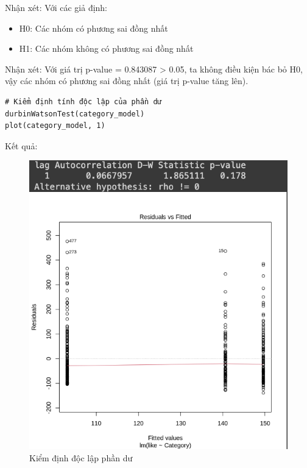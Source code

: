 \begin{itemize}
\begin{lstlisting}
    \end{lstlisting}
    Nhận xét:
    Với các giả định:
        \begin{itemize}
            \item H0: Các nhóm có phương sai đồng nhất
            \item H1: Các nhóm không có phương sai đồng nhất
        \end{itemize}
    Nhận xét: Với giá trị p-value = 0.843087 > 0.05, ta không điều kiện bác bỏ H0, vậy các nhóm có phương sai đồng nhất (giá trị p-value tăng lên).
    \begin{lstlisting}
# Kiểm định tính độc lập của phần dư
durbinWatsonTest(category_model)
plot(category_model, 1)
    \end{lstlisting}
    Kết quả:
    \begin{figure}[H]
        \centering
        \includegraphics[width=0.8\linewidth]{part23_figures/28.png}
        \caption{Kiểm định độc lập phần dư}
        \label{fig:Kiểm định độc lập phần dư__}
    \end{figure}


\end{itemize}
